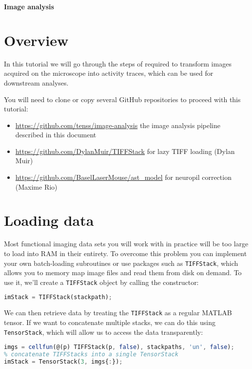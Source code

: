 \documentclass[a4paper]{report}
\begin{document}
\addtocounter{exercises}{1}

\begin{center}
\textbf{\Large{Image analysis}}
\end{center}	
\section{Overview}
In this tutorial we will go through the steps of required to transform images acquired on the microscope into activity traces, which can be used for downstream analyses.

You will need to clone or copy several GitHub repositories to proceed with this tutorial:
\begin{itemize}
	\item \href{https://github.com/tenss/image-analysis}{https://github.com/tenss/image-analysis} the image analysis pipeline described in this document 
	\item \href{https://github.com/DylanMuir/TIFFStack}{https://github.com/DylanMuir/TIFFStack} for lazy TIFF loading (Dylan Muir)
	\item \href{https://github.com/BaselLaserMouse/ast\_model}{https://github.com/BaselLaserMouse/ast\_model} for neuropil correction (Maxime Rio)
\end{itemize} 

\section{Loading data}
Most functional imaging data sets you will work with in practice will be too large to load into RAM in their entirety. 
To overcome this problem you can implement your own batch-loading subroutines or use packages such as \texttt{TIFFStack}, which allows you to memory map image files and read them from disk on demand. 
To use it, we'll create a \texttt{TIFFStack} object by calling the constructor:
\begin{lstlisting}[language=Octave]
imStack = TIFFStack(stackpath);
\end{lstlisting}
We can then retrieve data by treating the \texttt{TIFFStack} as a regular MATLAB tensor.
If we want to concatenate multiple stacks, we can do this using \texttt{TensorStack}, which will allow us to access the data transparently:
\begin{lstlisting}[language=Octave]
% create a TIFFStack for each file
imgs = cellfun(@(p) TIFFStack(p, false), stackpaths, 'un', false);
% concatenate TIFFStacks into a single TensorStack
imStack = TensorStack(3, imgs{:});
\end{lstlisting}
\end{document}
